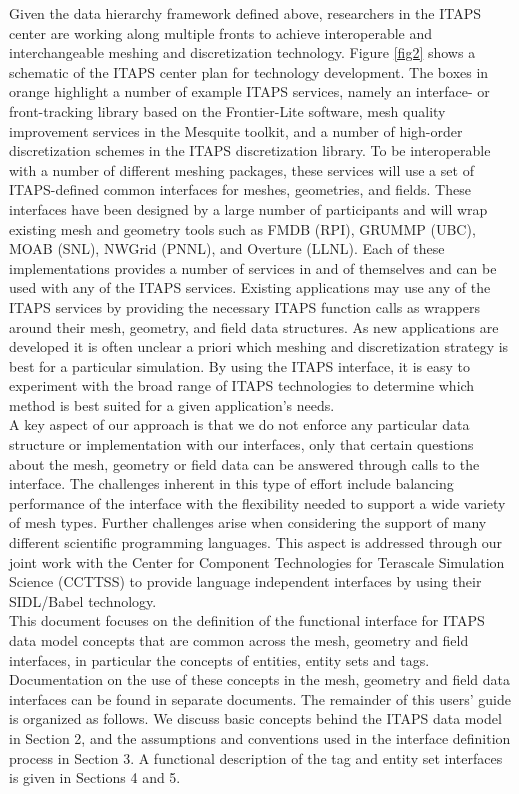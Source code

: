 \documentclass{article}
\begin{document}
Given the data hierarchy framework defined above, researchers 
in the ITAPS center are working along multiple fronts to achieve 
interoperable and interchangeable meshing and discretization 
technology. Figure \ref{fig2} shows a schematic of the ITAPS center plan 
for technology development. The boxes in orange highlight a number 
of example ITAPS services, namely an interface- or front-tracking 
library based on the Frontier-Lite software, mesh quality improvement 
services in the Mesquite toolkit, and a number of high-order 
discretization schemes in the ITAPS discretization library. To 
be interoperable with a number of different meshing packages, 
these services will use a set of ITAPS-defined common interfaces 
for meshes, geometries, and fields. These interfaces have been 
designed by a large number of participants and will wrap existing 
mesh and geometry tools such as FMDB (RPI), GRUMMP (UBC), MOAB 
(SNL), NWGrid (PNNL), and Overture (LLNL). Each of these implementations 
provides a number of services in and of themselves and can be 
used with any of the ITAPS services. Existing applications may 
use any of the ITAPS services by providing the necessary ITAPS 
function calls as wrappers around their mesh, geometry, and field 
data structures. As new applications are developed it is often 
unclear a priori which meshing and discretization strategy is 
best for a particular simulation. By using the ITAPS interface, 
it is easy to experiment with the broad range of ITAPS technologies 
to determine which method is best suited for a given application's 
needs.\\



A key aspect of our approach is that we do not enforce any particular 
data structure or implementation with our interfaces, only that 
certain questions about the mesh, geometry or field data can 
be answered through calls to the interface. The challenges inherent 
in this type of effort include balancing performance of the interface 
with the flexibility needed to support a wide variety of mesh 
types. Further challenges arise when considering the support 
of many different scientific programming languages. This aspect 
is addressed through our joint work with the Center for Component 
Technologies for Terascale Simulation Science (CCTTSS) to provide 
language independent interfaces by using their SIDL/Babel technology. \\

This document focuses on the definition of the functional interface 
for ITAPS data model concepts that are common across the mesh, 
geometry and field interfaces, in particular the concepts of 
entities, entity sets and tags. Documentation on the use of these 
concepts in the mesh, geometry and field data interfaces can 
be found in separate documents. The remainder of this users' 
guide is organized as follows. We discuss basic concepts behind 
the ITAPS data model in Section 2, and the assumptions and conventions 
used in the interface definition process in Section 3. A functional 
description of the tag and entity set interfaces is given in 
Sections 4 and 5. 
\end{document}
